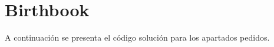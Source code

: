 \section{Birthbook}

  A continuación se presenta el código solución
  para los apartados pedidos.
  
  